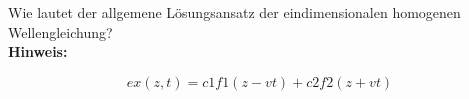 \begin{question}[section=2,name={eindimensionale_Wellengleichung},difficulty=,quantity=1,type=thr,tags={20060816}]
	Wie lautet der allgemene Lösungsansatz der eindimensionalen homogenen Wellengleichung?
	\\ \textbf{Hinweis:}\\
\end{question}
\begin{solution}
	\begin{equation}
	ex(z,t) = c1f1(z-vt) +c2f2(z+vt)
\end{equation}
\end{solution}
